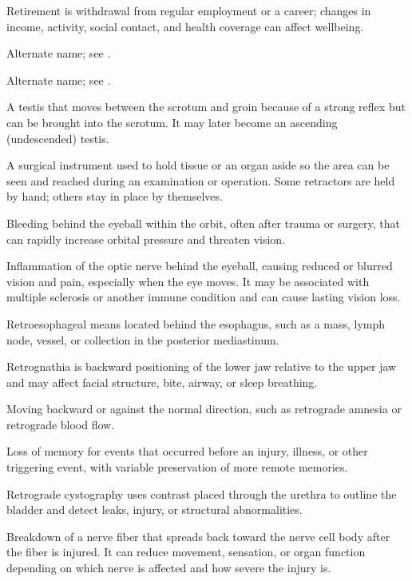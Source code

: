  Retirement is withdrawal from regular employment or a career; changes in income, activity, social contact, and health coverage can affect wellbeing.

 Alternate name; see .

 Alternate name; see .

 A testis that moves between the scrotum and groin because of a strong reflex but can be brought into the scrotum. It may later become an ascending (undescended) testis.

 A surgical instrument used to hold tissue or an organ aside so the area can be seen and reached during an examination or operation. Some retractors are held by hand; others stay in place by themselves.

 Bleeding behind the eyeball within the orbit, often after trauma or surgery, that can rapidly increase orbital pressure and threaten vision.

 Inflammation of the optic nerve behind the eyeball, causing reduced or blurred vision and pain, especially when the eye moves. It may be associated with multiple sclerosis or another immune condition and can cause lasting vision loss.

 Retroesophageal means located behind the esophagus, such as a mass, lymph node, vessel, or collection in the posterior mediastinum.

 Retrognathia is backward positioning of the lower jaw relative to the upper jaw and may affect facial structure, bite, airway, or sleep breathing.

 Moving backward or against the normal direction, such as retrograde amnesia or retrograde blood flow.

 Loss of memory for events that occurred before an injury, illness, or other triggering event, with variable preservation of more remote memories.

 Retrograde cystography uses contrast placed through the urethra to outline the bladder and detect leaks, injury, or structural abnormalities.

 Breakdown of a nerve fiber that spreads back toward the nerve cell body after the fiber is injured. It can reduce movement, sensation, or organ function depending on which nerve is affected and how severe the injury is.

